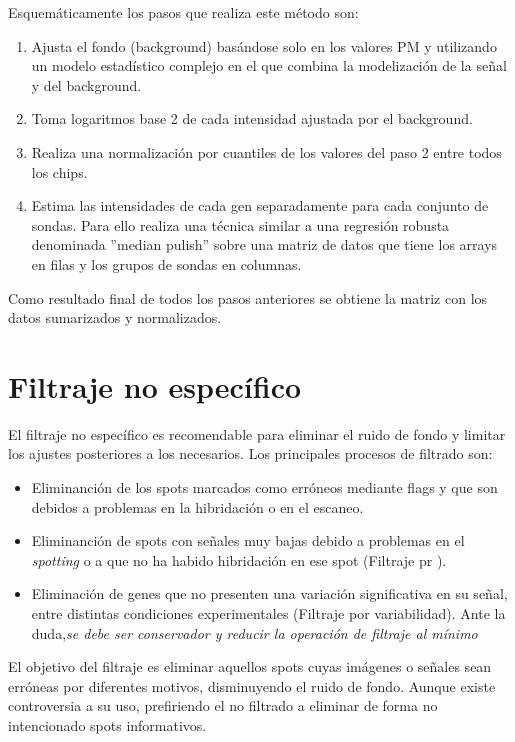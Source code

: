 Esquem\'aticamente los pasos que realiza este m\'etodo son:
\begin{enumerate}
\item Ajusta el fondo (background) bas\'andose solo en los valores PM y utilizando un modelo estad\'istico complejo
en el que combina la modelizaci\'on de la se\~nal y del background.
\item Toma logaritmos base 2 de cada intensidad ajustada por el background.
\item Realiza una normalizaci\'on por cuantiles de los valores del paso 2 entre todos los chips.
\item Estima las intensidades de cada gen separadamente para cada conjunto de sondas. Para ello realiza una t\'ecnica similar
a una regresi\'on robusta denominada ''median pulish'' sobre una matriz de datos que tiene los arrays en filas y los grupos
de sondas en columnas.
\end{enumerate}

Como resultado final de todos los pasos anteriores se obtiene la matriz con los  datos sumarizados y normalizados.


\section{Filtraje no espec\'ifico}


El filtraje no espec\'ifico es recomendable para eliminar el ruido de fondo y limitar los ajustes posteriores a los necesarios.
Los principales procesos de filtrado son:
\begin{itemize}
 \item Eliminanci\'on de los spots marcados como err\'oneos mediante  flags y que son debidos  a problemas en la hibridaci\'on o en el escaneo.
 \item Eliminanci\'on de spots con se\~nales muy bajas debido a problemas en el \emph{spotting} o a que no ha habido hibridaci\'on en ese spot (Filtraje pr ).
\item Eliminaci\'on de genes que no presenten una variaci\'on significativa en su se\~nal, entre distintas condiciones experimentales (Filtraje por variabilidad).
Ante la duda,\emph{se debe ser conservador y reducir la operaci\'on de filtraje al m\'inimo}
\end{itemize}
El objetivo del filtraje es eliminar aquellos spots cuyas im\'agenes o se\~nales sean err\'oneas por diferentes motivos, disminuyendo el ruido
de fondo. Aunque existe controversia a su uso, prefiriendo el no filtrado a eliminar de forma no intencionado spots informativos.







